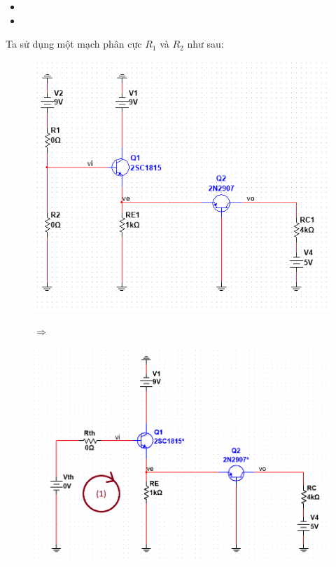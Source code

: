 \begin{itemize}[label=-, leftmargin=2cm]
	\item {}
	\item {}
\end{itemize}

Ta sử dụng một mạch phân cực $R_{1}$ và $R_{2}$ như sau:

\begin{figure}[H]
	\centering
	\begin{minipage}{.4\linewidth}
		\includegraphics[width=\linewidth]{./my-chapters/my-images/Question5/b_phancuc_R1_R2.png}
	\end{minipage}
	\begin{minipage}{.1\linewidth}
		$\Rightarrow$
	\end{minipage}
	\begin{minipage}{.4\linewidth}
		\includegraphics[width=\linewidth]{./my-chapters/my-images/Question5/b_phancuc_thevenin.png}
	\end{minipage}
\end{figure}

